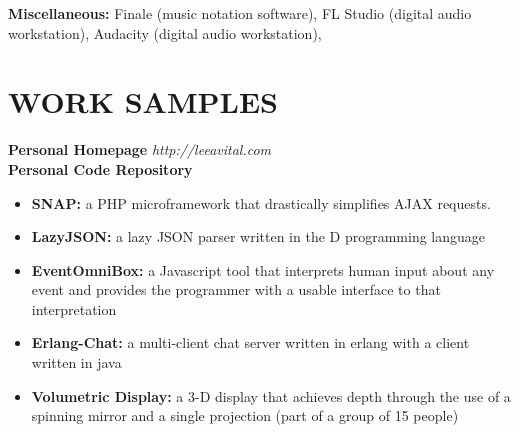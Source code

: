 \documentclass[line,margin]{res}
\begin{document}
\begin{resume}
\begin{tabbing}
	{\bf Miscellaneous: } \> Finale (music notation software), FL Studio (digital audio \\ 
				 \>workstation),  Audacity (digital audio workstation), 
	\end{tabbing}
	
 
\section{WORK SAMPLES} 
\vspace{-2ex}
\begin{tabbing}
{\bf Personal Homepage} \hspace{.5in}   \= {\sl http://leeavital.com} \\
{\bf Personal Code Repository}	
\end{tabbing}
  \begin{itemize}  \itemsep -2pt %
\item {\bf SNAP:} a PHP microframework that drastically simplifies AJAX requests.
\item {\bf LazyJSON:} a lazy JSON parser written in the D programming language
\item {\bf EventOmniBox:} a Javascript tool that interprets human input about any event and provides the programmer with a usable interface to that interpretation
\item {\bf Erlang-Chat: } a multi-client chat server written in erlang with a client written in java
\item {\bf Volumetric Display: } a 3-D display that achieves depth through the use of a spinning mirror and a single projection (part of a group of 15 people)
\end{itemize}



 

\end{resume}
\end{document}
